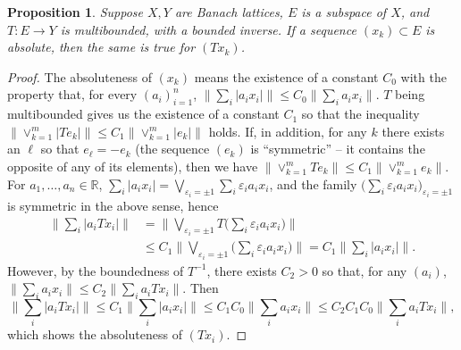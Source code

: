 \documentclass[12pt,leqno]{amsart}
\newtheorem{proposition}[theorem]{Proposition}
\numberwithin{equation}{section}
\theoremstyle{definition}
\def\vp{\varepsilon}
\def\R{{\mathbb R}}
\begin{document}
\begin{proposition}\label{abs to abs}
Suppose $X, Y$ are Banach lattices, $E$ is a subspace of $X$, and $T : E \to Y$ is multibounded, with a bounded inverse. If a sequence $(x_k) \subset E$ is absolute, then the same is true for $(Tx_k)$.
\end{proposition}

\begin{proof}
The absoluteness of $(x_k)$ means the existence of a constant $C_0$ with the property that, for every $(a_i)_{i=1}^n$, $\| \sum_i |a_i x_i| \| \leq C_0 \| \sum_i a_i x_i\|$.
$T$ being multibounded gives us the existence of a constant $C_1$ so that the inequality $\big\| \vee_{k=1}^m |T e_k| \big\| \leq C_1 \big\| \vee_{k=1}^m |e_k| \big\|$ holds. If, in addition, for any $k$ there exists an $\ell$ so that $e_\ell = - e_k$ (the sequence $(e_k)$ is ``symmetric'' -- it contains the opposite of any of its elements), then we have $\big\| \vee_{k=1}^m T e_k \big\| \leq C_1 \big\| \vee_{k=1}^m e_k \big\|$. 
For $a_1, \ldots, a_n \in \R$, $\sum_i |a_i x_i| = \bigvee_{\vp_i = \pm 1} \sum_i \vp_i a_i x_i$, and the family $\big(\sum_i \vp_i a_i x_i\big)_{\vp_i = \pm 1}$ is symmetric in the above sense, hence
\begin{align*}
\bigg\| \sum_i |a_i  T x_i| \bigg\| 
&
= \bigg\| \bigvee_{\vp_i = \pm 1} T \big( \sum_i \vp_i a_i x_i\big) \bigg\| 
\\
&
\leq C_1 \bigg\| \bigvee_{\vp_i = \pm 1}  \big( \sum_i \vp_i a_i x_i\big) \bigg\| = C_1 \bigg\| \sum_i |a_i x_i| \bigg\| .
\end{align*}
However, by the boundedness of $T^{-1}$, there exists $C_2 > 0$ so that, for any $(a_i)$, $\|\sum_i a_i x_i\| \leq C_2 \|\sum_i a_i  T x_i\|$. Then 
$$
\bigg\| \sum_i |a_i T x_i| \bigg\| \leq C_1 \bigg\| \sum_i |a_i x_i| \bigg\| \leq C_1 C_0 \bigg\| \sum_i a_i x_i \bigg\| \leq C_2 C_1 C_0 \bigg\| \sum_i a_i T x_i \bigg\| ,
$$
which shows the absoluteness of $(Tx_i)$.
\end{proof}
\end{document}
